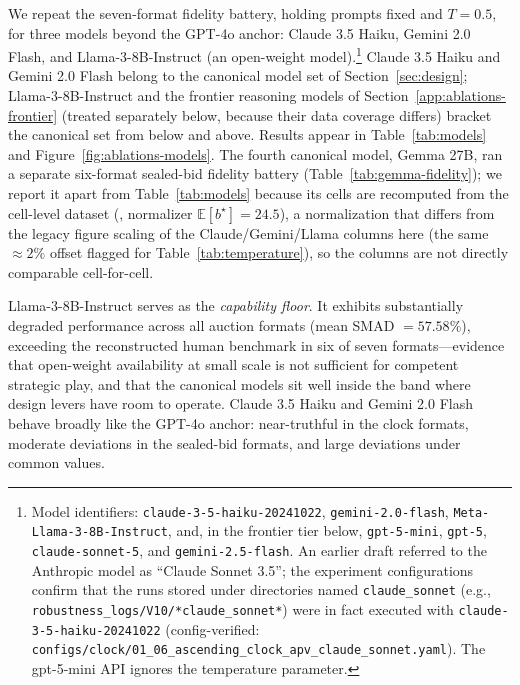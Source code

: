 We repeat the seven-format fidelity battery, holding prompts fixed and $T=0.5$, for three models beyond the GPT-4o anchor: Claude 3.5 Haiku, Gemini 2.0 Flash, and Llama-3-8B-Instruct (an open-weight model).\footnote{Model identifiers: \texttt{claude-3-5-haiku-20241022}, \texttt{gemini-2.0-flash}, \texttt{Meta-Llama-3-8B-Instruct}, and, in the frontier tier below, \texttt{gpt-5-mini}, \texttt{gpt-5}, \texttt{claude-sonnet-5}, and \texttt{gemini-2.5-flash}. An earlier draft referred to the Anthropic model as ``Claude Sonnet 3.5''; the experiment configurations confirm that the runs stored under directories named \texttt{claude\_sonnet} (e.g., \texttt{robustness\_logs/V10/*claude\_sonnet*}) were in fact executed with \texttt{claude-3-5-haiku-20241022} (config-verified: \texttt{configs/clock/01\_06\_ascending\_clock\_apv\_claude\_sonnet.yaml}). The gpt-5-mini API ignores the temperature parameter.} Claude 3.5 Haiku and Gemini 2.0 Flash belong to the canonical model set of Section~\ref{sec:design}; Llama-3-8B-Instruct and the frontier reasoning models of Section~\ref{app:ablations-frontier} (treated separately below, because their data coverage differs) bracket the canonical set from below and above. Results appear in Table~\ref{tab:models} and Figure~\ref{fig:ablations-models}. The fourth canonical model, Gemma 27B, ran a separate six-format sealed-bid fidelity battery (Table~\ref{tab:gemma-fidelity}); we report it apart from Table~\ref{tab:models} because its cells are recomputed from the cell-level dataset (, normalizer $\mathbb{E}[b^\star]=24.5$), a normalization that differs from the legacy figure scaling of the Claude/Gemini/Llama columns here (the same $\approx\!2\%$ offset flagged for Table~\ref{tab:temperature}), so the columns are not directly comparable cell-for-cell.

Llama-3-8B-Instruct serves as the \emph{capability floor}. It exhibits substantially degraded performance across all auction formats (mean SMAD $= 57.58\%$), exceeding the reconstructed human benchmark in six of seven formats---evidence that open-weight availability at small scale is not sufficient for competent strategic play, and that the canonical models sit well inside the band where design levers have room to operate. Claude 3.5 Haiku and Gemini 2.0 Flash behave broadly like the GPT-4o anchor: near-truthful in the clock formats, moderate deviations in the sealed-bid formats, and large deviations under common values.  

